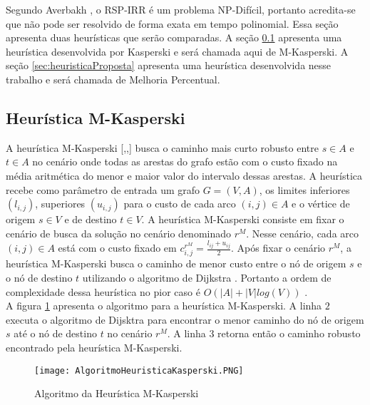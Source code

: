 ﻿Segundo Averbakh \cite{Averbakh2005273}, o RSP-IRR é um problema NP-Difícil, portanto acredita-se que não pode ser resolvido de forma exata em tempo polinomial.
Essa seção apresenta duas heurísticas que serão comparadas. A seção \ref{sec:MKasperski} apresenta uma heurística desenvolvida 
por Kasperski e será chamada aqui de M-Kasperski. A seção \ref{sec:heuristicaProposta} apresenta uma 
heurística desenvolvida nesse trabalho e será chamada de Melhoria Percentual. \\

\subsection{Heurística M-Kasperski}\label{sec:MKasperski}
A heurística M-Kasperski [\cite{kasperski06},\cite{kasperski07},\cite{kasperski09}] busca o caminho mais curto robusto
entre $s \in A$ e $t \in A$ no cenário onde todas as arestas do grafo estão com o custo fixado na média aritmética do menor e maior
valor do intervalo dessas arestas. A heurística recebe como parâmetro de entrada um grafo $G=(V,A)$,
os limites inferiores $(l_{i,j})$, superiores $(u_{i,j})$ para o custo de cada arco $(i,j) \in A$ e o vértice de
origem $s \in V$ e de destino $t \in V$. A heurística M-Kasperski consiste em fixar o cenário de busca da solução
no cenário denominado $r^M$. Nesse cenário, cada arco $(i,j) \in A$ está com o custo fixado em $c^{r^M}_{i,j} = \frac{l_{ij}+u_{ij}}{2}$.
Após fixar o cenário $r^M$, a heurística M-Kasperski busca o caminho de menor custo entre o nó de origem $s$ e o nó de destino $t$ utilizando
o algoritmo de Dijkstra \cite{dijkstra59}. Portanto a ordem de complexidade dessa heurística no pior caso é $O(|A| + |V|log(V))$ \cite{dijkstra59}. \\
A figura \ref{f_Kasperski} apresenta o algoritmo para a heurística M-Kasperski.
A linha $2$ executa o algoritmo de
Dijsktra \cite{dijkstra59} para encontrar o menor caminho do nó de origem $s$ até o nó de destino $t$ no cenário $r^M$.
A linha $3$ retorna então o caminho robusto encontrado pela heurística M-Kasperski.
\begin{figure}
\centering
\texttt{[image: AlgoritmoHeuristicaKasperski.PNG]}
\caption{Algoritmo da Heurística M-Kasperski}
\label{f_Kasperski}
\end{figure}

